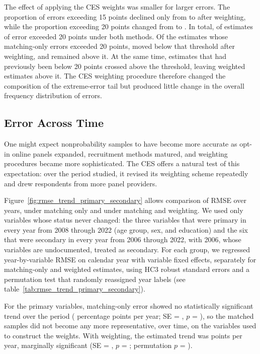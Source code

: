 \documentclass[12pt]{article}
\begin{document}
The effect of applying the CES weights was smaller for larger errors. The proportion of errors exceeding 15 points declined only from \ErrBeyondFifteenMatching{} to \ErrBeyondFifteenWeighted{} after weighting, while the proportion exceeding 20 points changed from \ErrBeyondTwentyMatching{} to \ErrBeyondTwentyWeighted{}. In total, \ErrBeyondTwentyBoth{} of estimates of error exceeded 20 points under both methods. Of the \NBeyondTwentyMatching{} estimates whose matching-only errors exceeded 20 points, \NMovedBelowTwenty{} moved below that threshold after weighting, and \NStayedBeyondTwenty{} remained above it. At the same time, \NCrossedAboveTwenty{} estimates that had previously been below 20 points crossed above the threshold, leaving \NBeyondTwentyWeighted{} weighted estimates above it. The CES weighting procedure therefore changed the composition of the extreme-error tail but produced little change in the overall frequency distribution of errors.

\subsection{Error Across Time}
One might expect nonprobability samples to have become more accurate as opt-in online panels expanded, recruitment methods matured, and weighting procedures became more sophisticated. The CES offers a natural test of this expectation: over the period studied, it revised its weighting scheme repeatedly and drew respondents from more panel providers.

Figure~\ref{fig:rmse_trend_primary_secondary} allows comparison of RMSE over years, under matching only and under matching and weighting. We used only variables whose status never changed: the three variables that were primary in every year from 2008 through 2022 (age group, sex, and education) and the six that were secondary in every year from 2006 through 2022, with 2006, whose variables are undocumented, treated as secondary. For each group, we regressed year-by-variable RMSE on calendar year with variable fixed effects, separately for matching-only and weighted estimates, using HC3 robust standard errors and a permutation test that randomly reassigned year labels (see table~\ref{tab:rmse_trend_primary_secondary}).

For the primary variables, matching-only error showed no statistically significant trend over the period (\TrendPrimMatchBeta{} percentage points per year; SE = \TrendPrimMatchSE{}, $p$ = \TrendPrimMatchP{}), so the matched samples did not become any more representative, over time, on the variables used to construct the weights. With weighting, the estimated trend was \TrendPrimWtdBeta{} points per year, marginally significant (SE = \TrendPrimWtdSE{}, $p$ = \TrendPrimWtdP{}; permutation $p$ = \TrendPrimWtdPermP{}).
\end{document}
